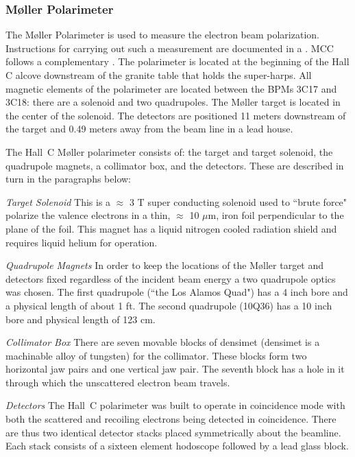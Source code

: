 \subsubsection{M\o ller Polarimeter }
The M\o ller Polarimeter is used to measure the electron beam
polarization. Instructions for carrying out such a measurement
are documented in a 
.
MCC follows a complementary 
.
The polarimeter is located at the beginning of the Hall C
alcove downstream of the granite table that holds the super-harps.
All magnetic elements of the polarimeter are located between
the BPMs 3C17 and 3C18: there are a solenoid and two quadrupoles.
The M\o ller target is located in the center of the solenoid. The
detectors are positioned 11 meters downstream of the target and 0.49
meters away from the beam line in a lead house.

The Hall~C M\o ller polarimeter consists of: the target and target solenoid, the quadrupole magnets, a 
collimator box, and the detectors.  These are described in turn in 
the paragraphs below:

{\sl Target Solenoid} This is a $\approx$ 3 T super conducting
solenoid used to ``brute force" polarize the valence electrons in a
thin, $\approx$ 10 $\mu$m, iron foil perpendicular to the
plane of the foil. This magnet has a liquid nitrogen cooled radiation shield
and requires liquid helium for operation.

{\sl Quadrupole Magnets} In order to keep the locations of the M\o ller
target and detectors fixed regardless of the incident beam energy
a two quadrupole optics was chosen. The first quadrupole (``the Los Alamos Quad")
has a 4 inch bore and a physical length of about 1 ft.
The second quadrupole (10Q36) has a 10 inch bore and physical length of 123 cm.

{\sl Collimator Box} There are seven movable blocks of densimet (densimet is
a machinable alloy of tungsten) for the collimator. These blocks form two
horizontal jaw pairs and one vertical jaw pair. The seventh block has a
hole in it through which the unscattered electron beam travels.

{\sl Detectors} The Hall~C polarimeter was built to operate in coincidence
mode with both the scattered and recoiling electrons being detected in
coincidence. There are thus two identical detector stacks placed symmetrically
about the beamline. Each stack consists of a sixteen element hodoscope
followed by a lead glass block.

